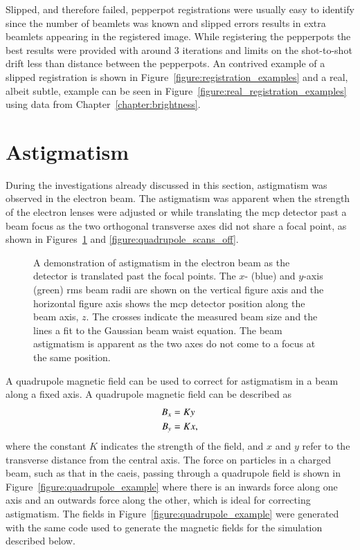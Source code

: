 Slipped, and therefore failed, pepperpot registrations were usually easy to identify since the number of beamlets was known and slipped errors results in extra beamlets appearing in the registered image.
While registering the pepperpots the best results were provided with around 3 iterations and limits on the shot-to-shot drift less than distance between the pepperpots.
An contrived example of a slipped registration is shown in Figure~\ref{figure:registration_examples} and a real, albeit subtle, example can be seen in Figure~\ref{figure:real_registration_examples} using data from Chapter~\ref{chapter:brightness}.

\section{Astigmatism}\label{section:quadrupole}

During the investigations already discussed in this section, astigmatism was observed in the electron beam.
The astigmatism was apparent when the strength of the electron lenses were adjusted or while translating the \gls{mcp} detector past a beam focus as the two orthogonal transverse axes did not share a focal point, as shown in Figures~\ref{figure:astigmatism_translation} and \ref{figure:quadrupole_scans_off}.

\begin{figure}
    \centering
    
    \caption[Electron beam astigmatism.]{A demonstration of astigmatism in the electron beam as the detector is translated past the focal points. The $x$- (blue) and $y$-axis (green) \gls{rms} beam radii are shown on the vertical figure axis and the horizontal figure axis shows the \gls{mcp} detector position along the beam axis, $z$.
    The crosses indicate the measured beam size and the lines a fit to the Gaussian beam waist equation.
    The beam astigmatism is apparent as the two axes do not come to a focus at the same position.}
    \label{figure:astigmatism_translation}
\end{figure}

A quadrupole magnetic field can be used to correct for astigmatism in a beam along a fixed axis.
A quadrupole magnetic field can be described as
\begin{align}
B_x &= K y \notag\\
B_y &= K x,
\end{align}
where the constant $K$ indicates the strength of the field, and $x$ and $y$ refer to the transverse distance from the central axis.
The force on particles in a charged beam, such as that in the \gls{caeis}, passing through a quadrupole field is shown in Figure~\ref{figure:quadrupole_example} where there is an inwards force along one axis and an outwards force along the other, which is ideal for correcting astigmatism.
The fields in Figure~\ref{figure:quadrupole_example} were generated with the same code used to generate the magnetic fields for the simulation described below.

